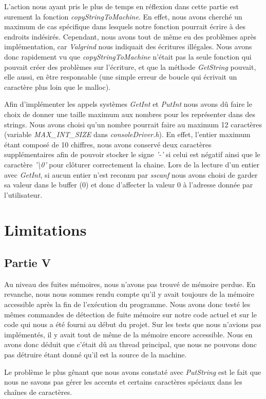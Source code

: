 \documentclass{article}
\begin{document}
L'action nous ayant pris le plus de temps en réflexion dans cette partie est
surement la fonction \textit{copyStringToMachine}. En effet, nous avons cherché
un maximum de cas spécifique dans lesquels notre fonction pourrait écrire à des
endroits indésirés. Cependant, nous avons tout de même eu des problèmes après
implémentation, car \textit{Valgrind} nous indiquait des écritures illégales.
Nous avons donc rapidement vu que \textit{copyStringToMachine} n'était pas la
seule fonction qui pouvait créer des problèmes sur l'écriture, et que la
méthode \textit{GetString} pouvait, elle aussi, en être responsable (une simple
erreur de boucle qui écrivait un caractère plus loin que le malloc).

Afin d'implémenter les appels systèmes \textit{GetInt} et \textit{PutInt} nous avons dû
faire le choix de donner une taille maximum aux nombres pour les représenter dans des strings.
Nous avons choisi qu'un nombre pourrait faire au maximum 12 caractères (variable \textit{MAX\_INT\_SIZE} dans
\textit{consoleDriver.h}). En effet, l'entier maximum
étant composé de 10 chiffres, nous avons conservé deux caractères supplémentaires afin de pouvoir stocker
le signe \textit{'-'} si celui est négatif ainsi que le caractère \textit{'\textbackslash0'} pour clôturer correctement
la chaine. Lors de la lecture d'un entier avec \textit{GetInt}, si aucun entier n'est reconnu par
\textit{sscanf} nous avons choisi de garder sa valeur dans le buffer (0) et donc d'affecter la valeur 0 à l'adresse
donnée par l'utilisateur.
\section{Limitations}
\subsection{Partie V}
Au niveau des fuites mémoires, nous n'avons pas trouvé de mémoire perdue. En
revanche, nous nous sommes rendu compte qu'il y avait toujours de la mémoire
accessible après la fin de l'exécution du programme. Nous avons donc testé les
mêmes commandes de détection de fuite mémoire sur notre code actuel et sur le
code qui nous a été fourni au début du projet. Sur les tests que nous n'avions
pas implémentés, il y avait tout de même de la mémoire encore accessible. Nous
en avons donc déduit que c'était dû au thread principal, que nous ne pouvons
donc pas détruire étant donné qu'il est la source de la machine.

Le problème le plus gênant que nous avons constaté avec \textit{PutString} est
le fait que nous ne savons pas gérer les accents et certains caractères
spéciaux dans les chaînes de caractères.
\end{document}
